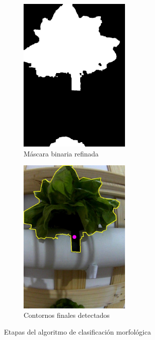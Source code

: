 \begin{figure}[H]
\vspace{0.3cm}

\begin{subfigure}[b]{0.48\textwidth}
    \centering
    \includegraphics[width=0.6\textwidth]{imagenes/clasificador_5_binario_final.jpg}
    \caption{Máscara binaria refinada}
\end{subfigure}
\hfill
\begin{subfigure}[b]{0.48\textwidth}
    \centering
    \includegraphics[width=0.6\textwidth]{imagenes/clasificador_6_contornos.jpg}
    \caption{Contornos finales detectados}
\end{subfigure}

\caption{Etapas del algoritmo de clasificación morfológica}
\label{fig:clasificador_etapa2}
\end{figure}


